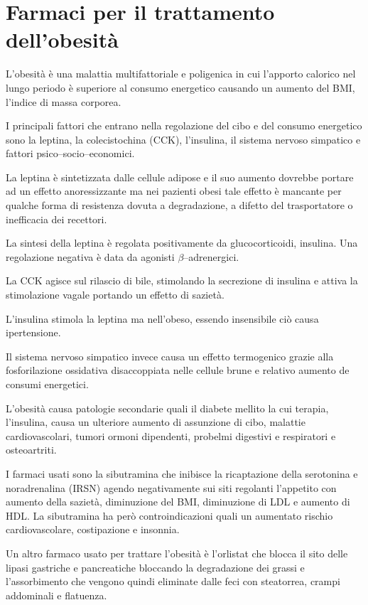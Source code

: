 \section{Farmaci per il trattamento dell'obesità}

L'obesità è una malattia multifattoriale e poligenica in cui l'apporto calorico nel lungo periodo è superiore al consumo energetico causando un aumento del BMI, l'indice di massa corporea.

I principali fattori che entrano nella regolazione del cibo e del consumo energetico sono la leptina, la colecistochina (CCK), l'insulina, il sistema nervoso simpatico e fattori psico--socio--economici.

La leptina è sintetizzata dalle cellule adipose e il suo aumento dovrebbe portare ad un effetto anoressizzante ma nei pazienti obesi tale effetto è mancante per qualche forma di resistenza dovuta a degradazione, a difetto del trasportatore o inefficacia dei recettori.

La sintesi della leptina è regolata positivamente da glucocorticoidi, insulina. Una regolazione negativa è data da agonisti $\beta$--adrenergici.

La CCK agisce sul rilascio di bile, stimolando la secrezione di insulina e attiva la stimolazione vagale portando un effetto di sazietà.

L'insulina stimola la leptina ma nell'obeso, essendo insensibile ciò causa ipertensione.

Il sistema nervoso simpatico invece causa un effetto termogenico grazie alla fosforilazione ossidativa disaccoppiata nelle cellule brune e relativo aumento de consumi energetici.

L'obesità causa patologie secondarie quali il diabete mellito la cui terapia, l'insulina, causa un ulteriore aumento di assunzione di cibo, malattie cardiovascolari, tumori ormoni dipendenti, probelmi digestivi e respiratori e osteoartriti.

I farmaci usati sono la sibutramina che inibisce la ricaptazione della serotonina e noradrenalina (IRSN) agendo negativamente sui siti regolanti l'appetito con aumento della sazietà, diminuzione del BMI, diminuzione di LDL e aumento di HDL. La sibutramina ha però controindicazioni quali un aumentato rischio cardiovascolare, costipazione e insonnia.

Un altro farmaco usato per trattare l'obesità è l'orlistat che blocca il sito delle lipasi gastriche e pancreatiche bloccando la degradazione dei grassi e l'assorbimento che vengono quindi eliminate dalle feci con steatorrea, crampi addominali e flatuenza.

